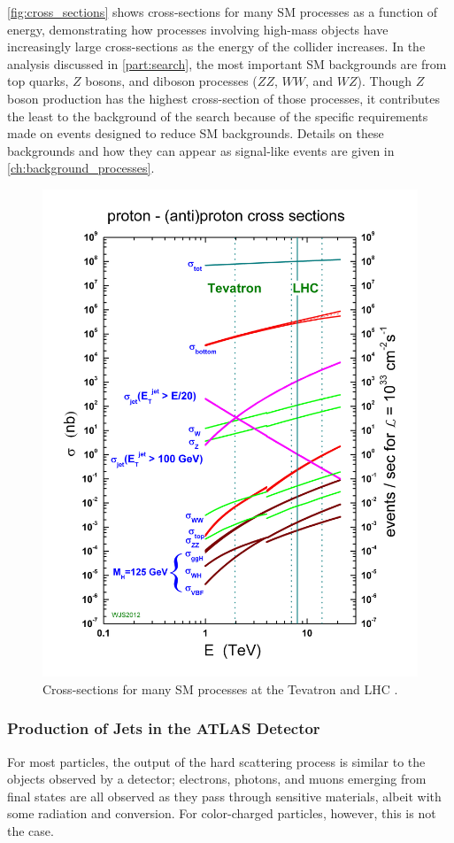 \autoref{fig:cross_sections} shows cross-sections for many \ac{SM} processes as a function of energy, demonstrating how processes involving high-mass objects have increasingly large cross-sections as the energy of the collider increases. In the analysis discussed in \autoref{part:search}, the most important \ac{SM} backgrounds are from top quarks, $Z$ bosons, and diboson processes ($ZZ$, $WW$, and $WZ$). Though $Z$ boson production has the highest cross-section of those processes, it contributes the least to the background of the search because of the specific requirements made on events designed to reduce \ac{SM} backgrounds. Details on these backgrounds and how they can appear as signal-like events are given in \autoref{ch:background_processes}. 

\begin{centering}
\begin{figure}[!hbt]
\myfloatalign
\includegraphics[width=.60\linewidth]{figures/lhc/crosssections2013.jpg}
\caption{Cross-sections for many \ac{SM} processes at the Tevatron and \ac{LHC} \cite{crosssections}.}
\label{fig:cross_sections}
\end{figure}
\end{centering}

\subsubsection{Production of Jets in the ATLAS Detector}
\label{sec:pheno_jets}

For most particles, the output of the hard scattering process is similar to the objects observed by a detector; electrons, photons, and muons emerging from final states are all observed as they pass through sensitive materials, albeit with some radiation and conversion. For color-charged particles, however, this is not the case.

